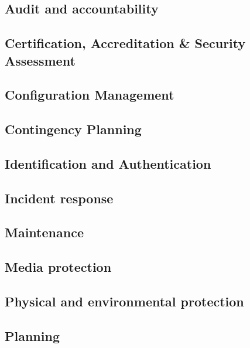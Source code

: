 \documentclass[../main.tex]{subfiles}
\begin{document}
\subsection{Audit and accountability}


\subsection{Certification, Accreditation \& Security Assessment}


\subsection{Configuration Management}


\subsection{Contingency Planning}


\subsection{Identification and Authentication}


\subsection{Incident response}


\subsection{Maintenance}


\subsection{Media protection}

\vfill\newpage
\subsection{Physical and environmental protection}


\subsection{Planning}

\end{document}

